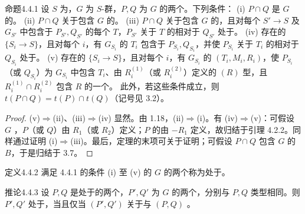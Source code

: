 \begin{SGAresult}{命题}{4.4.1}
设 $S$ 为，$G$ 为 $S$-群，$P,Q$ 为 $G$ 的两个。下列条件：
(i) $P\cap Q$ 是 $G$ 的。
(ii) $P\cap Q$ 关于包含 $G$ 的。
(iii) $P\cap Q$ 关于包含 $G$ 的，且对每个 $S'\to S$ 及 $G_{S'}$ 中包含于 $P_{S'},Q_{S'}$ 的每个 $T$，$P_{S'}$ 关于 $T$ 的相对于 $Q_{S'}$ 处于。
(iv) 存在的 $\{S_i\to S\}$，且对每个 $i$，有 $G_{S_i}$ 的 $T_i$ 包含于 $P_{S_i},Q_{S_i}$，并使 $P_{S_i}$ 关于 $T_i$ 的相对于 $Q_{S_i}$ 处于。
(v) 存在的 $\{S_i\to S\}$，且对每个 $i$，有 $G_{S_i}$ 的 $(T_i,M_i,R_i)$，使 $P_{S_i}$（或 $Q_{S_i}$）为 $G_{S_i}$ 中包含 $T_i$、由 $R_i^{(1)}$（或 $R_i^{(2)}$）定义的 $(R)$ 型，且 $R_i^{(1)}\cap R_i^{(2)}$ 包含 $R$ 的一个。
此外，若这些条件成立，则 $t(P\cap Q)=t(P)\cap t(Q)$（记号见 3.2）。
\end{SGAresult}
\begin{proof}
(v)$\Rightarrow$(ii)、(iii)$\Rightarrow$(iv) 显然。由 1.18，(ii)$\Rightarrow$(i)。有 (iv)$\Rightarrow$(v)：可假设 $G$ ，$P$（或 $Q$）由 $R_1$（或 $R_2$）定义；$P$ 的由 $-R_1$ 定义，故归结于引理 4.2.2。同样通过证明 (i)$\Rightarrow$(iii)。最后，定理的末项可关于证明；可假设 $P\cap Q$ 包含 $G$ 的 $B$，于是归结于 3.7。
\end{proof}
\begin{SGAresult}{定义}{4.4.2}
满足 4.4.1 的条件 (i) 至 (v) 的 $G$ 的两个称为处于。
\end{SGAresult}
\begin{SGAresult}{推论}{4.4.3}
设 $P,Q$ 是处于的两个，$P',Q'$ 为 $G$ 的两个，分别与 $P,Q$ 类型相同。则 $P',Q'$ 处于，当且仅当 $(P',Q')$ 关于与 $(P,Q)$ 。
\end{SGAresult}
